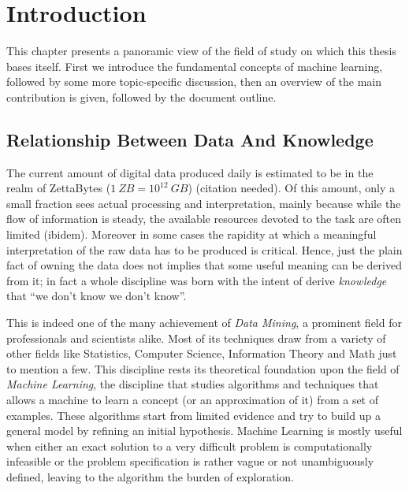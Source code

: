 
\chapter{Introduction} %
\label{Chapter1} %

This chapter presents a panoramic view of the field of study on which this thesis
bases itself.
First we introduce the fundamental concepts of machine learning, followed by
some more topic-specific discussion, then an overview of the main contribution
is given, followed by the document outline.

\section{Relationship Between Data And Knowledge}

The current amount of digital data produced daily is estimated to be in the realm of 
ZettaBytes ($1~ZB = 10^{12}~GB$) (citation needed).
Of this amount, only a small fraction sees actual processing and interpretation,
mainly because while the flow of information is steady, the available resources
devoted to the task are often limited (ibidem).
Moreover in some cases the rapidity at which a meaningful interpretation of the 
raw data has to be produced is critical.
Hence, just the plain fact of owning the data does not implies that some useful 
meaning can be derived from it; in fact a whole discipline was born with the
intent of derive \emph{knowledge} that ``we don't know we don't know''.

This is indeed one of the many achievement of \emph{Data Mining}, a prominent field for
professionals and scientists alike.
Most of its techniques draw from a variety of other fields like Statistics,
Computer Science, Information Theory and Math just to mention a few.
This discipline rests its theoretical foundation upon the field of \emph{Machine Learning},
the discipline that studies algorithms and techniques that allows a machine
to learn a concept (or an approximation of it) from a set of examples.
These algorithms start from limited evidence and try to build up a general model
by refining an initial hypothesis.
Machine Learning is mostly useful when either an exact solution to a very
difficult problem is computationally infeasible or the problem specification
is rather vague or not unambiguously defined, leaving to the algorithm the burden
of exploration.

